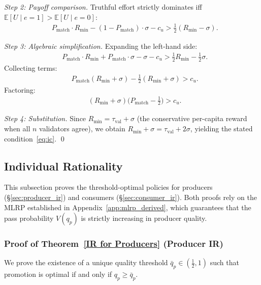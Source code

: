 \textit{Step 2: Payoff comparison.} Truthful effort strictly dominates iff $\mathbb{E}[U \mid e=1] > \mathbb{E}[U \mid e=0]$:
\begin{align}
& P_{\text{match}} \cdot R_{\min} - (1 - P_{\text{match}}) \cdot \sigma - c_u > \tfrac{1}{2}(R_{\min} - \sigma). \nonumber
\end{align}

\textit{Step 3: Algebraic simplification.} Expanding the left-hand side:
\begin{align}
& P_{\text{match}} \cdot R_{\min} + P_{\text{match}} \cdot \sigma - \sigma - c_u > \tfrac{1}{2} R_{\min} - \tfrac{1}{2}\sigma. \nonumber
\end{align}
Collecting terms:
\begin{align}
& P_{\text{match}} (R_{\min} + \sigma) - \tfrac{1}{2}(R_{\min} + \sigma) > c_u. \nonumber
\end{align}
Factoring:
\begin{align}
& (R_{\min} + \sigma)\Big(P_{\text{match}} - \tfrac{1}{2}\Big) > c_u.
\end{align}

\textit{Step 4: Substitution.} Since $R_{\min} = \tau_{\text{val}} + \sigma$ (the conservative per-capita reward when all $n$ validators agree), we obtain $R_{\min} + \sigma = \tau_{\text{val}} + 2\sigma$, yielding the stated condition~\eqref{eq:ic}. \qed


\subsection{Individual Rationality}
\label{app:ir_proofs}

This subsection proves the threshold-optimal policies for producers (\S\ref{sec:producer_ir}) and consumers (\S\ref{sec:consumer_ir}). Both proofs rely on the MLRP established in Appendix~\ref{app:mlrp_derived}, which guarantees that the pass probability $V(q_p)$ is strictly increasing in producer quality.

\subsubsection{Proof of Theorem~\ref{IR for Producers} (Producer IR)}
\label{app:proof_producer_ir}

We prove the existence of a unique quality threshold $\bar{q}_p \in (\frac{1}{2}, 1)$ such that promotion is optimal if and only if $q_p \geq \bar{q}_p$.

